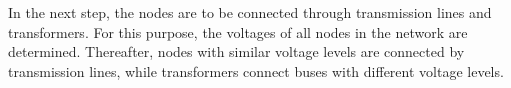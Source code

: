 \documentclass[10pt,conference]{IEEEtran}
\begin{document}
	In the next step, the nodes are to be connected through transmission lines and transformers. For this purpose, the voltages of all nodes in the network are determined. Thereafter, nodes with similar voltage levels are connected by transmission lines, while transformers connect buses with different voltage levels.
	
	
	
	
\end{document}
